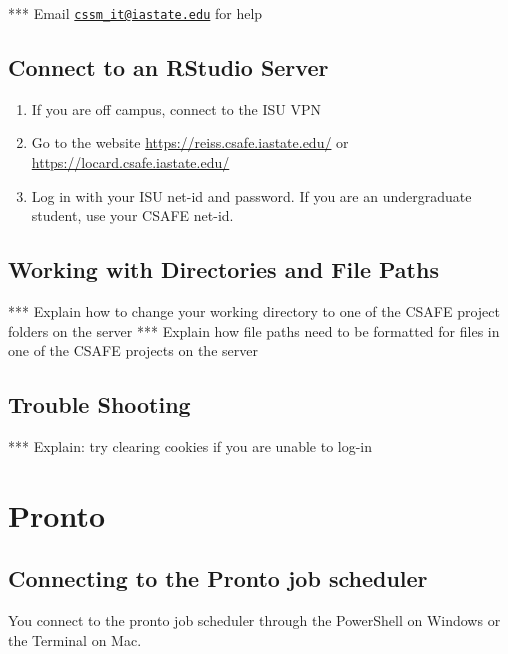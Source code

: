 \documentclass[
]{book}
\providecommand{\tightlist}{%
  \setlength{\itemsep}{0pt}\setlength{\parskip}{0pt}}
\begin{document}
*** Email \href{mailto:cssm_it@iastate.edu}{\nolinkurl{cssm\_it@iastate.edu}} for help

\hypertarget{connect-to-an-rstudio-server}{%
\section{Connect to an RStudio Server}\label{connect-to-an-rstudio-server}}

\begin{enumerate}
\def\labelenumi{\arabic{enumi}.}
\tightlist
\item
  If you are off campus, connect to the ISU VPN
\item
  Go to the website \url{https://reiss.csafe.iastate.edu/} or \url{https://locard.csafe.iastate.edu/}
\item
  Log in with your ISU net-id and password. If you are an undergraduate student, use your CSAFE net-id.
\end{enumerate}

\hypertarget{working-with-directories-and-file-paths}{%
\section{Working with Directories and File Paths}\label{working-with-directories-and-file-paths}}

*** Explain how to change your working directory to one of the CSAFE project folders on the server
*** Explain how file paths need to be formatted for files in one of the CSAFE projects on the server

\hypertarget{trouble-shooting}{%
\section{Trouble Shooting}\label{trouble-shooting}}

*** Explain: try clearing cookies if you are unable to log-in

\hypertarget{pronto}{%
\chapter{Pronto}\label{pronto}}

\hypertarget{connecting-to-pronto}{%
\section{Connecting to the Pronto job scheduler}\label{connecting-to-pronto}}

You connect to the pronto job scheduler through the PowerShell on Windows or the Terminal on Mac.
\end{document}
